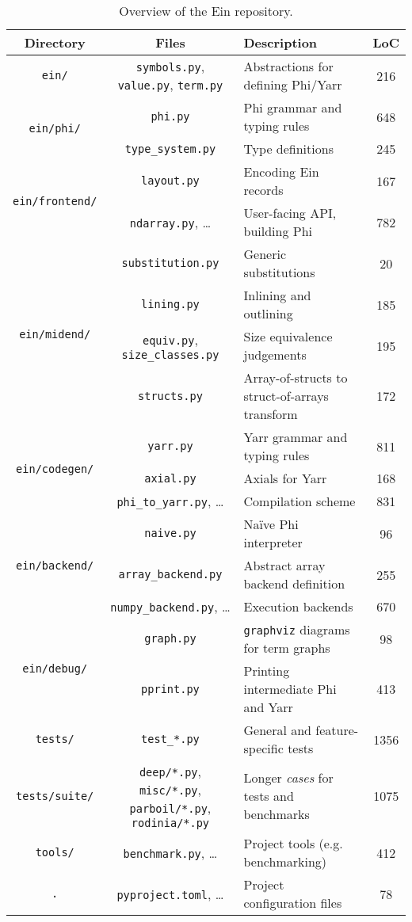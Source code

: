 \begin{table}[h]
    \centering
    \begin{tabular}{c|c|l|c}
        Directory & Files & Description & LoC \\ \hline \hline
        {\texttt{ein/}} & \texttt{symbols.py}, \texttt{value.py}, \texttt{term.py} & Abstractions for defining Phi/Yarr & 216 \\ \hline
        \multirow{2}{*}{\texttt{ein/phi/}} & \texttt{phi.py} & Phi grammar and typing rules & 648 \\
        & \texttt{type\_system.py} & Type definitions & 245 \\ \hline
        \multirow{2}{*}{\texttt{ein/frontend/}} & \texttt{layout.py} & Encoding Ein records & 167 \\
        & \texttt{ndarray.py}, \dots & User-facing API, building Phi & 782 \\ \hline
        \multirow{4}{*}{\texttt{ein/midend/}} & \texttt{substitution.py} & Generic substitutions & 20 \\
        & \texttt{lining.py} & Inlining and outlining & 185 \\
        & \texttt{equiv.py}, \texttt{size\_classes.py} & Size equivalence judgements & 195 \\
        & \texttt{structs.py} & Array-of-structs to struct-of-arrays transform & 172 \\ \hline
        \multirow{3}{*}{\texttt{ein/codegen/}} & \texttt{yarr.py} & Yarr grammar and typing rules & 811 \\
        & \texttt{axial.py} & Axials for Yarr & 168 \\
        & \texttt{phi\_to\_yarr.py}, \dots & Compilation scheme & 831 \\ \hline
        \multirow{3}{*}{\texttt{ein/backend/}} & \texttt{naive.py} & Na\"ive Phi interpreter & 96 \\
        & \texttt{array\_backend.py} & Abstract array backend definition & 255 \\
        & \texttt{numpy\_backend.py}, \dots & Execution backends & 670 \\ \hline
        \multirow{2}{*}{\texttt{ein/debug/}} & \texttt{graph.py} & \texttt{graphviz} diagrams for term graphs & 98 \\
        & \texttt{pprint.py} & Printing intermediate Phi and Yarr & 413 \\ \hline
        \texttt{tests/} & \texttt{test\_*.py} & General and feature-specific tests & 1356 \\ \hline
        \texttt{tests/suite/} & \makecell{\texttt{deep/*.py}, \texttt{misc/*.py}, \\ \texttt{parboil/*.py}, \texttt{rodinia/*.py}} & Longer \textit{cases} for tests and benchmarks & 1075 \\ \hline
        \texttt{tools/} & \texttt{benchmark.py}, \dots & Project tools (e.g. benchmarking) & 412 \\ \hline
        \texttt{.} & \texttt{pyproject.toml}, \dots & Project configuration files & 78
    \end{tabular}
    \caption{Overview of the Ein repository.}
    \label{tab:repository}
\end{table}